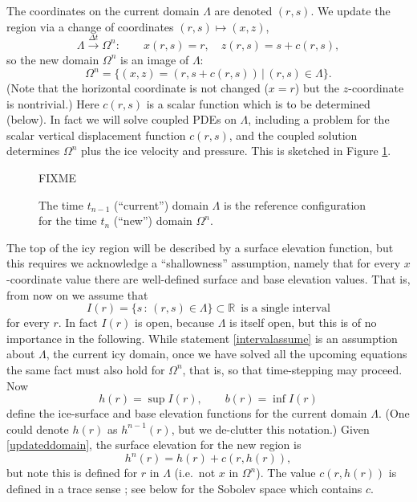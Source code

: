 \documentclass[letterpaper,final,12pt,reqno]{amsart}
\newcommand{\RR}{\mathbb{R}}
\begin{document}
The coordinates on the current domain $\Lambda$ are denoted $(r,s)$.  We update the region via a change of coordinates $(r,s) \mapsto (x,z)$,
\begin{equation}
\Lambda \stackrel{\Delta t}{\to} \Omega^n: \qquad x(r,s)=r, \quad z(r,s)=s+c(r,s), \label{changecoords}
\end{equation}
so the new domain $\Omega^n$ is an image of $\Lambda$:
\begin{equation}
\Omega^n = \{(x,z)=(r,s+c(r,s)) \,\big|\, (r,s) \in \Lambda\}.  \label{updateddomain}
\end{equation}
(Note that the horizontal coordinate is not changed ($x=r$) but the $z$-coordinate is nontrivial.)  Here $c(r,s)$ is a scalar function which is to be determined (below).  In fact we will solve coupled PDEs on $\Lambda$, including a problem for the scalar vertical displacement function $c(r,s)$, and the coupled solution determines $\Omega^n$ plus the ice velocity and pressure.  This is sketched in Figure \ref{fig:domainupdate}.

\begin{figure}[h]

FIXME

\caption{The time $t_{n-1}$ (``current'') domain $\Lambda$ is the reference configuration for the time $t_n$ (``new'') domain $\Omega^n$.}
\label{fig:domainupdate}
\end{figure}

The top of the icy region will be described by a surface elevation function, but this requires we acknowledge a ``shallowness'' assumption, namely that for every $x$-coordinate value there are well-defined surface and base elevation values.  That is, from now on we assume that
\begin{equation}
I(r) = \{s\,:\,(r,s) \in \Lambda\} \subset \RR \, \text{ is a single interval}\label{intervalassume}
\end{equation}
for every $r$.  In fact $I(r)$ is open, because $\Lambda$ is itself open, but this is of no importance in the following.  While statement \eqref{intervalassume} is an assumption about $\Lambda$, the current icy domain, once we have solved all the upcoming equations the same fact must also hold for $\Omega^n$, that is, so that time-stepping may proceed.  Now
    $$h(r) = \sup I(r), \qquad b(r) = \inf I(r)$$
define the ice-surface and base elevation functions for the current domain $\Lambda$.  (One could denote $h(r)$ as $h^{n-1}(r)$, but we de-clutter this notation.)  Given \eqref{updateddomain}, the surface elevation for the new region is
\begin{equation}
h^n(r) = h(r) + c(r,h(r)),  \label{newsurfaceelevation}
\end{equation}
but note this is defined for $r$ in $\Lambda$ (i.e.~not $x$ in $\Omega^n$).  The value $c(r,h(r))$ is defined in a trace sense \cite{Evans2010}; see below for the Sobolev space which contains $c$.
\end{document}
